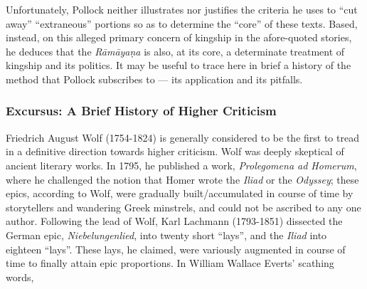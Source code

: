 Unfortunately, Pollock neither illustrates nor justifies the criteria he uses to “cut away”  ``extraneous'' portions so as to determine the “core” of these texts. Based, instead, on this alleged primary concern of kingship in the afore-quoted stories, he deduces that the {\sl Rāmāyaṇa} is also, at its core, a determinate treatment of kingship and its politics. It may be useful to trace here in brief a history of the method that Pollock subscribes to --- its application and its pitfalls.  

\subsubsection{Excursus: A   Brief History of Higher Criticism}\label{sec1.1.1.1}

Friedrich August Wolf (1754-1824) is generally considered to be the first to tread in a definitive direction towards higher criticism. Wolf was deeply skeptical of ancient literary works. In 1795, he published a work, {\sl Prolegomena ad Homerum}, where he challenged the notion that Homer wrote the {\sl Iliad} or the {\sl Odyssey}; these epics, according to Wolf, were gradually built/accumulated in course of time by storytellers and wandering Greek minstrels, and could not be ascribed to any one author. Following the lead of Wolf, Karl Lachmann (1793-1851) dissected the German epic, {\sl Niebelungenlied}, into twenty short “lays”, and the {\sl Iliad} into eighteen “lays”. These lays, he claimed, were variously augmented in course of time to finally attain epic proportions. In William Wallace Everts’ scathing words, 

